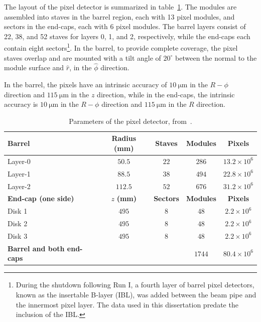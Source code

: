 The layout of the pixel detector is summarized in table~\ref{table:ATLAS-pixel-layout}.  The modules are assembled into staves in the barrel region, each with 13 pixel modules, and sectors in the end-caps, each with 6 pixel modules. The barrel layers consist of 22, 38, and 52 staves for layers 0, 1, and 2, respectively, while the end-caps each contain eight sectors\footnote{During the shutdown following Run I, a fourth layer of barrel pixel detectors, known as the insertable B-layer (IBL), was added between the beam pipe and the innermost pixel layer. The data used in this dissertation predate the inclusion of the IBL.}. In the barrel, to provide complete coverage, the pixel staves overlap and are mounted with a tilt angle of $20^{\circ}$ between the normal to the module surface and $\hat{r}$, in the $\hat{\phi}$ direction. 

In the barrel, the pixels have an intrinsic accuracy of $\SI{10}{\micro\meter}$ in the $R-\phi$ direction and $\SI{115}{\micro\meter}$ in the $z$ direction, while in the end-caps, the intrinsic accuracy is $\SI{10}{\micro\meter}$ in the $R-\phi$ direction and $\SI{115}{\micro\meter}$ in the $R$ direction.

\begin{table}[htbp]
	\centering
	\begin{tabular}{|l|c|c|c|c|}
		\hline
		\textbf{Barrel} & \textbf{Radius (mm)} & \textbf{Staves} & \textbf{Modules} & \textbf{Pixels} \\
		\hline
		Layer-0 & $50.5$ & $22$ & $286$ & $13.2\times 10^6$ \\
		Layer-1 & $88.5$ & $38$ & $494$ & $22.8\times 10^6$ \\
		Layer-2 & $112.5$ & $52$ & $676$ & $31.2\times 10^6$ \\
		\hline
		\textbf{End-cap (one side)} & $z$ \textbf{(mm)} & \textbf{Sectors} & \textbf{Modules} & \textbf{Pixels} \\
		\hline
		Disk 1 & $495$ & $8$ & $48$ & $2.2\times 10^6$ \\
		Disk 2 & $495$ & $8$ & $48$ & $2.2\times 10^6$ \\
		Disk 3 & $495$ & $8$ & $48$ & $2.2\times 10^6$ \\
		\hline
		\textbf{Barrel and both end-caps} & & & $1744$ & $80.4\times 10^6$ \\
		\hline
	\end{tabular}
	\caption{Parameters of the pixel detector, from~\cite{TheATLASCollaboration:2008fg}.}
	\label{table:ATLAS-pixel-layout}
\end{table}

